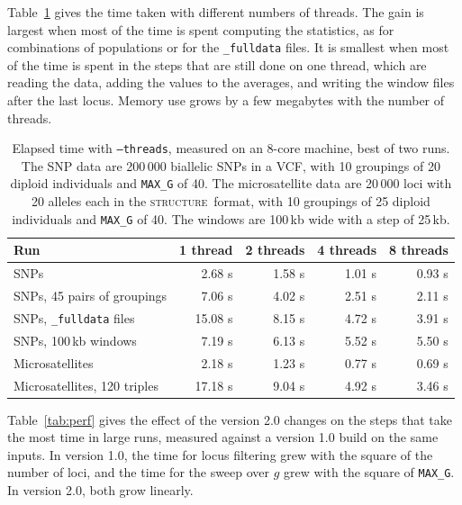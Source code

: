 \documentclass[11pt]{article}
\newcommand{\structureprog}{\textsc{structure}}
\newcommand{\flag}[1]{\texttt{#1}}
\begin{document}
Table~\ref{tab:threads} gives the time taken with different numbers of threads.
The gain is largest when most of the time is spent computing the statistics,
as for combinations of populations or for the \texttt{\_fulldata} files. It is
smallest when most of the time is spent in the steps that are still done on one
thread, which are reading the data, adding the values to the averages, and
writing the window files after the last locus. Memory use grows by a few
megabytes with the number of threads.

\begin{table}[htbp]
\centering
\begin{tabular}{lrrrr}
\toprule
Run & 1 thread & 2 threads & 4 threads & 8 threads \\
\midrule
SNPs & 2.68 s & 1.58 s & 1.01 s & 0.93 s \\
SNPs, 45 pairs of groupings & 7.06 s & 4.02 s & 2.51 s & 2.11 s \\
SNPs, \texttt{\_fulldata} files & 15.08 s & 8.15 s & 4.72 s & 3.91 s \\
SNPs, 100\,kb windows & 7.19 s & 6.13 s & 5.52 s & 5.50 s \\
Microsatellites & 2.18 s & 1.23 s & 0.77 s & 0.69 s \\
Microsatellites, 120 triples & 17.18 s & 9.04 s & 4.92 s & 3.46 s \\
\bottomrule
\end{tabular}
\caption{Elapsed time with \flag{--threads}, measured on an 8-core machine,
best of two runs. The SNP data are 200\,000 biallelic SNPs in a VCF, with 10
groupings of 20 diploid individuals and \texttt{MAX\_G} of 40. The
microsatellite data are 20\,000 loci with 20 alleles each in the
\structureprog\ format, with 10 groupings of 25 diploid individuals and
\texttt{MAX\_G} of 40. The windows are 100\,kb wide with a step of 25\,kb.}
\label{tab:threads}
\end{table}

Table~\ref{tab:perf} gives the effect of the version 2.0 changes on the steps
that take the most time in large runs, measured against a version 1.0 build on
the same inputs. In version 1.0, the time for locus filtering grew with the
square of the number of loci, and the time for the sweep over $g$ grew with
the square of \texttt{MAX\_G}. In version 2.0, both grow linearly.
\end{document}
